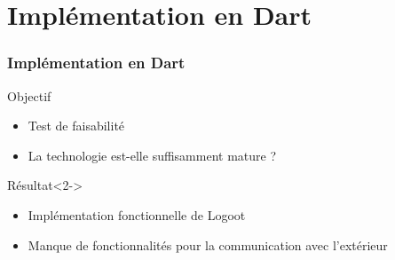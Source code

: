 \section{Implémentation en Dart}
  \begin{frame}
    \frametitle{Implémentation en Dart}
    \begin{block}{Objectif}
      \begin{itemize}
        \item Test de faisabilité
        \item La technologie est-elle suffisamment mature ?
      \end{itemize}
    \end{block}
    \begin{block}{Résultat}<2->
      \begin{itemize}
        \item Implémentation fonctionnelle de Logoot
        \item Manque de fonctionnalités pour la communication avec l'extérieur
      \end{itemize}
    \end{block}
  \end{frame}

